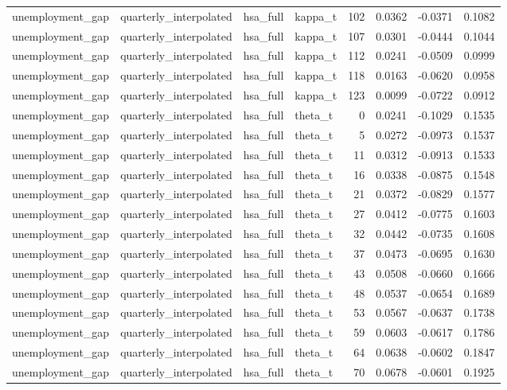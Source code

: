 \begin{tabular}{llllrrrr}
unemployment\_gap & quarterly\_interpolated & hsa\_full & kappa\_t & 102 & 0.0362 & -0.0371 & 0.1082 \\
unemployment\_gap & quarterly\_interpolated & hsa\_full & kappa\_t & 107 & 0.0301 & -0.0444 & 0.1044 \\
unemployment\_gap & quarterly\_interpolated & hsa\_full & kappa\_t & 112 & 0.0241 & -0.0509 & 0.0999 \\
unemployment\_gap & quarterly\_interpolated & hsa\_full & kappa\_t & 118 & 0.0163 & -0.0620 & 0.0958 \\
unemployment\_gap & quarterly\_interpolated & hsa\_full & kappa\_t & 123 & 0.0099 & -0.0722 & 0.0912 \\
unemployment\_gap & quarterly\_interpolated & hsa\_full & theta\_t & 0 & 0.0241 & -0.1029 & 0.1535 \\
unemployment\_gap & quarterly\_interpolated & hsa\_full & theta\_t & 5 & 0.0272 & -0.0973 & 0.1537 \\
unemployment\_gap & quarterly\_interpolated & hsa\_full & theta\_t & 11 & 0.0312 & -0.0913 & 0.1533 \\
unemployment\_gap & quarterly\_interpolated & hsa\_full & theta\_t & 16 & 0.0338 & -0.0875 & 0.1548 \\
unemployment\_gap & quarterly\_interpolated & hsa\_full & theta\_t & 21 & 0.0372 & -0.0829 & 0.1577 \\
unemployment\_gap & quarterly\_interpolated & hsa\_full & theta\_t & 27 & 0.0412 & -0.0775 & 0.1603 \\
unemployment\_gap & quarterly\_interpolated & hsa\_full & theta\_t & 32 & 0.0442 & -0.0735 & 0.1608 \\
unemployment\_gap & quarterly\_interpolated & hsa\_full & theta\_t & 37 & 0.0473 & -0.0695 & 0.1630 \\
unemployment\_gap & quarterly\_interpolated & hsa\_full & theta\_t & 43 & 0.0508 & -0.0660 & 0.1666 \\
unemployment\_gap & quarterly\_interpolated & hsa\_full & theta\_t & 48 & 0.0537 & -0.0654 & 0.1689 \\
unemployment\_gap & quarterly\_interpolated & hsa\_full & theta\_t & 53 & 0.0567 & -0.0637 & 0.1738 \\
unemployment\_gap & quarterly\_interpolated & hsa\_full & theta\_t & 59 & 0.0603 & -0.0617 & 0.1786 \\
unemployment\_gap & quarterly\_interpolated & hsa\_full & theta\_t & 64 & 0.0638 & -0.0602 & 0.1847 \\
unemployment\_gap & quarterly\_interpolated & hsa\_full & theta\_t & 70 & 0.0678 & -0.0601 & 0.1925 \\

\end{tabular}

